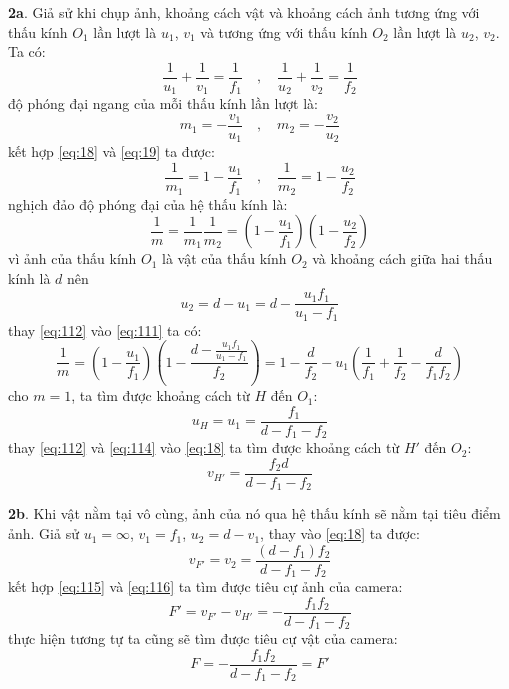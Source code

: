 \noindent \textbf{2a}. Giả sử khi chụp ảnh, khoảng cách vật và khoảng cách ảnh tương ứng với thấu kính $O_{1}$ lần lượt là $u_{1}$, $v_{1}$ và tương ứng với thấu kính $O_{2}$ lần lượt là $u_{2}$, $v_{2}$. Ta có:
\begin{equation}
  \label{eq:18}
  \frac{1}{u_{1}}+\frac{1}{v_{1}}=\frac{1}{f_{1}}\quad,\quad\frac{1}{u_{2}}+\frac{1}{v_{2}}=\frac{1}{f_{2}}
\end{equation}
độ phóng đại ngang của mỗi thấu kính lần lượt là:
\begin{equation}
  \label{eq:19}
  m_{1}=-\frac{v_{1}}{u_{1}}\quad,\quad m_{2}=-\frac{v_{2}}{u_{2}}
\end{equation}
kết hợp \eqref{eq:18} và \eqref{eq:19} ta được:
\begin{equation}
  \label{eq:110}
  \frac{1}{m_{1}}=1-\frac{u_{1}}{f_{1}}\quad,\quad\frac{1}{m_{2}}=1-\frac{u_{2}}{f_{2}}
\end{equation}
nghịch đảo độ phóng đại của hệ thấu kính là:
\begin{equation}
  \label{eq:111}
  \frac{1}{m}=\frac{1}{m_{1}}\frac{1}{m_{2}}=\left(1-\frac{u_{1}}{f_{1}}\right)\left(1-\frac{u_{2}}{f_{2}}\right)
\end{equation}
vì ảnh của thấu kính $O_{1}$ là vật của thấu kính $O_{2}$ và khoảng cách giữa hai thấu kính là $d$ nên
\begin{equation}
  \label{eq:112}
  u_{2}=d-u_{1}=d-\frac{u_{1}f_{1}}{u_{1}-f_{1}}
\end{equation}
thay \eqref{eq:112} vào \eqref{eq:111} ta có:
\begin{equation}
  \label{eq:113}
  \frac{1}{m}=\left(1-\frac{u_{1}}{f_{1}}\right)\left(1-\frac{d-\frac{u_{1}f_{1}}{u_{1}-f_{1}}}{f_{2}}\right)=1-\frac{d}{f_{2}}-u_{1}\left(\frac{1}{f_{1}}+\frac{1}{f_{2}}-\frac{d}{f_{1}f_{2}}\right)
\end{equation}
cho $m=1$, ta tìm được khoảng cách từ $H$ đến $O_{1}$:
\begin{equation}
  \label{eq:114}
  u_{H}=u_{1}=\frac{f_{1}}{d-f_{1}-f_{2}}
\end{equation}
thay \eqref{eq:112} và \eqref{eq:114} vào \eqref{eq:18} ta tìm được khoảng cách từ $H'$ đến $O_{2}$:
\begin{equation}
  \label{eq:115}
  v_{H'}=\frac{f_{2}d}{d-f_{1}-f_{2}}
\end{equation}

\noindent \textbf{2b}. Khi vật nằm tại vô cùng, ảnh của nó qua hệ thấu kính sẽ nằm tại tiêu điểm ảnh. Giả sử $u_{1}=\infty$, $v_{1}=f_{1}$, $u_{2}=d-v_{1}$, thay vào \eqref{eq:18} ta được:
\begin{equation}
  \label{eq:116}
  v_{F'}=v_{2}=\frac{(d-f_{1})f_{2}}{d-f_{1}-f_{2}}
\end{equation}
kết hợp \eqref{eq:115} và \eqref{eq:116} ta tìm được tiêu cự ảnh của camera:
\begin{equation}
  \label{eq:117}
  F'=v_{F'}-v_{H'}=-\frac{f_{1}f_{2}}{d-f_{1}-f_{2}}
\end{equation}
thực hiện tương tự ta cũng sẽ tìm được tiêu cự vật của camera:
\begin{equation}
  \label{eq:118}
  F=-\frac{f_{1}f_{2}}{d-f_{1}-f_{2}}=F'
\end{equation}